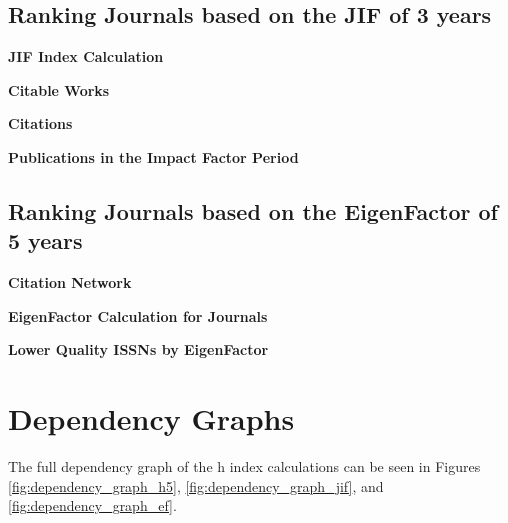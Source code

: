 \subsection{Ranking Journals based on the JIF of 3 years}

\textbf{JIF Index Calculation}





\textbf{Citable Works}





\textbf{Citations}





\textbf{Publications in the Impact Factor Period}



\subsection{Ranking Journals based on the EigenFactor of 5 years}

\textbf{Citation Network}



\textbf{EigenFactor Calculation for Journals}



\textbf{Lower Quality ISSNs by EigenFactor}



\section{Dependency Graphs}
The full dependency graph of the h index calculations can be seen in Figures
\ref{fig:dependency_graph_h5}, \ref{fig:dependency_graph_jif}, and
\ref{fig:dependency_graph_ef}.

